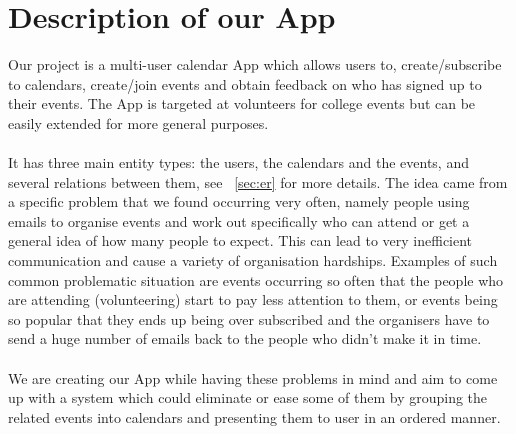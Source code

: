\documentclass[10pt,a4paper]{article}
\begin{document}
\section{Description of our App}
Our project is a multi-user calendar App which allows users to, create/subscribe to calendars, create/join events and obtain feedback on who has signed up to their events. The App is targeted at volunteers for college events but can be easily extended for more general purposes.
\\
\\
\noindent
It has three main entity types: the users, the calendars and the events, and several relations between them, see ~\cref{sec:er} for more details. The idea came from a specific problem that we found occurring very often, namely people using emails to organise events and work out specifically who can attend or get a general idea of how many people to expect. This can lead to very inefficient communication and cause a variety of organisation hardships. Examples of such common problematic situation are events occurring so often that the people who are attending (volunteering) start to pay less attention to them, or events being so popular that they ends up being over subscribed and the organisers have to send a huge number of emails back to the people who didn't make it in time.
\\
\\
\noindent
We are creating our App while having these problems in mind and aim to come up with a system which could eliminate or ease some of them by grouping the related events into calendars and presenting them to user in an ordered manner.
\end{document}
